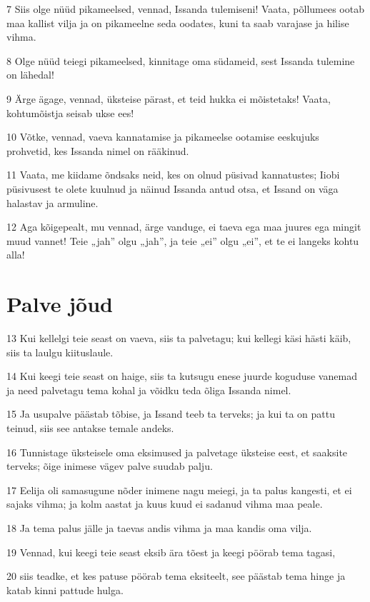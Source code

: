 \par 7 Siis olge nüüd pikameelsed, vennad, Issanda tulemiseni! Vaata, põllumees ootab maa kallist vilja ja on pikameelne seda oodates, kuni ta saab varajase ja hilise vihma.
\par 8 Olge nüüd teiegi pikameelsed, kinnitage oma südameid, sest Issanda tulemine on lähedal!
\par 9 Ärge ägage, vennad, üksteise pärast, et teid hukka ei mõistetaks! Vaata, kohtumõistja seisab ukse ees!
\par 10 Võtke, vennad, vaeva kannatamise ja pikameelse ootamise eeskujuks prohvetid, kes Issanda nimel on rääkinud.
\par 11 Vaata, me kiidame õndsaks neid, kes on olnud püsivad kannatustes; Iiobi püsivusest te olete kuulnud ja näinud Issanda antud otsa, et Issand on väga halastav ja armuline.
\par 12 Aga kõigepealt, mu vennad, ärge vanduge, ei taeva ega maa juures ega mingit muud vannet! Teie „jah” olgu „jah”, ja teie „ei” olgu „ei”, et te ei langeks kohtu alla!

\section*{Palve jõud}

\par 13 Kui kellelgi teie seast on vaeva, siis ta palvetagu; kui kellegi käsi hästi käib, siis ta laulgu kiituslaule.
\par 14 Kui keegi teie seast on haige, siis ta kutsugu enese juurde koguduse vanemad ja need palvetagu tema kohal ja võidku teda õliga Issanda nimel.
\par 15 Ja usupalve päästab tõbise, ja Issand teeb ta terveks; ja kui ta on pattu teinud, siis see antakse temale andeks.
\par 16 Tunnistage üksteisele oma eksimused ja palvetage üksteise eest, et saaksite terveks; õige inimese vägev palve suudab palju.
\par 17 Eelija oli samasugune nõder inimene nagu meiegi, ja ta palus kangesti, et ei sajaks vihma; ja kolm aastat ja kuus kuud ei sadanud vihma maa peale.
\par 18 Ja tema palus jälle ja taevas andis vihma ja maa kandis oma vilja.
\par 19 Vennad, kui keegi teie seast eksib ära tõest ja keegi pöörab tema tagasi,
\par 20 siis teadke, et kes patuse pöörab tema eksiteelt, see päästab tema hinge ja katab kinni pattude hulga.



